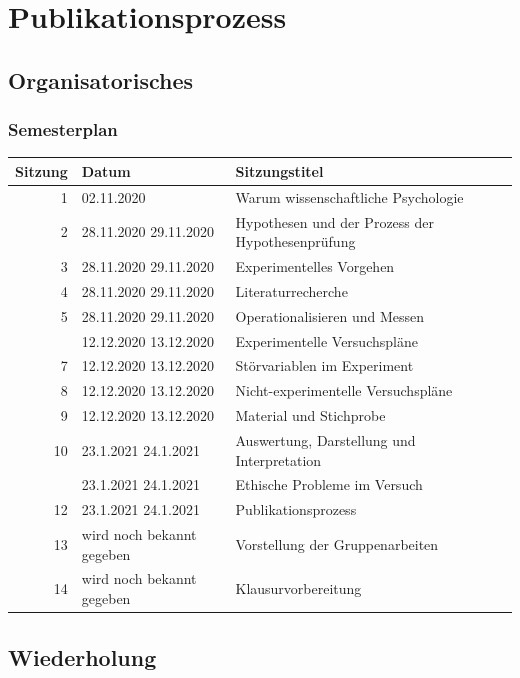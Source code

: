 \documentclass[
]{book}
\begin{document}
\hypertarget{publikationsprozess}{%
\chapter{Publikationsprozess}\label{publikationsprozess}}

\hypertarget{organisatorisches-11}{%
\section{Organisatorisches}\label{organisatorisches-11}}

\hypertarget{semesterplan-12}{%
\subsection{Semesterplan}\label{semesterplan-12}}

\begin{tabular}[t]{rll}
\toprule
Sitzung & Datum & Sitzungstitel\\
\midrule
1 & 02.11.2020 & Warum wissenschaftliche Psychologie\\
2 & 28.11.2020
29.11.2020 & Hypothesen und der Prozess der Hypothesenprüfung\\
3 & 28.11.2020
29.11.2020 & Experimentelles Vorgehen\\
4 & 28.11.2020
29.11.2020 & Literaturrecherche\\
5 & 28.11.2020
29.11.2020 & Operationalisieren und Messen\\
\addlinespace
6 & 12.12.2020
13.12.2020 & Experimentelle Versuchspläne\\
7 & 12.12.2020
13.12.2020 & Störvariablen im Experiment\\
8 & 12.12.2020
13.12.2020 & Nicht-experimentelle Versuchspläne\\
9 & 12.12.2020
13.12.2020 & Material und Stichprobe\\
10 & 23.1.2021
24.1.2021 & Auswertung, Darstellung und Interpretation\\
\addlinespace
11 & 23.1.2021
24.1.2021 & Ethische Probleme im Versuch\\
12 & 23.1.2021
24.1.2021 & Publikationsprozess\\
13 & wird noch bekannt gegeben & Vorstellung der Gruppenarbeiten\\
14 & wird noch bekannt gegeben & Klausurvorbereitung\\
\bottomrule
\end{tabular}

\hypertarget{wiederholung-10}{%
\section{Wiederholung}\label{wiederholung-10}}
\end{document}
